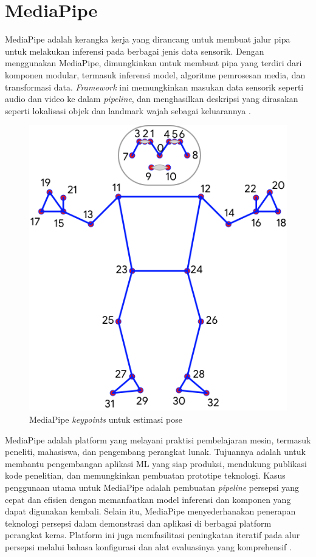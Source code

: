 \section{MediaPipe}
\label{sec:mediapipe}

MediaPipe adalah kerangka kerja yang dirancang untuk membuat jalur pipa untuk melakukan inferensi pada berbagai jenis data sensorik. Dengan menggunakan MediaPipe, dimungkinkan untuk membuat pipa yang terdiri dari komponen modular, termasuk inferensi model, algoritme pemrosesan media, dan transformasi data. \emph{Framework} ini memungkinkan masukan data sensorik seperti audio dan video ke dalam \emph{pipeline}, dan menghasilkan deskripsi yang dirasakan seperti lokalisasi objek dan landmark wajah sebagai keluarannya \parencite{Lugaresi}.

\begin{figure}[H]
  \centering
  \includegraphics[scale=1.3]{gambar/mediapipeb2.png}
  \caption{MediaPipe \emph{keypoints} untuk estimasi pose \parencite{Bazarevsky}}
  \label{fig:mediapipe}
\end{figure}

MediaPipe adalah platform yang melayani praktisi pembelajaran mesin, termasuk peneliti, mahasiswa, dan pengembang perangkat lunak. Tujuannya adalah untuk membantu pengembangan aplikasi ML yang siap produksi, mendukung publikasi kode penelitian, dan memungkinkan pembuatan prototipe teknologi. Kasus penggunaan utama untuk MediaPipe adalah pembuatan \emph{pipeline} persepsi yang cepat dan efisien dengan memanfaatkan model inferensi dan komponen yang dapat digunakan kembali. Selain itu, MediaPipe menyederhanakan penerapan teknologi persepsi dalam demonstrasi dan aplikasi di berbagai platform perangkat keras. Platform ini juga memfasilitasi peningkatan iteratif pada alur persepsi melalui bahasa konfigurasi dan alat evaluasinya yang komprehensif \parencite{Lugaresi}.

